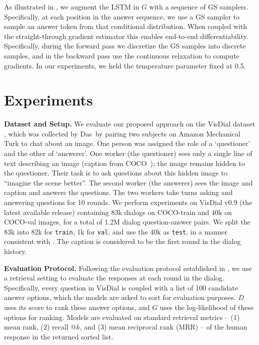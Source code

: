 \documentclass{article}
\newcommand{\vd}{VisDial\xspace}
\newcommand{\train}{\texttt{train}\xspace}
\newcommand{\val}{\texttt{val}\xspace}
\newcommand{\test}{\texttt{test}\xspace}
\begin{document}
As illustrated in , we augment the LSTM in $G$ with a sequence of GS samplers. 
Specifically, at each position in the answer sequence, we use a GS sampler to sample an answer token from that conditional 
distribution. 
When coupled with the straight-through gradient estimator 
\cite{BengioLC13, jang2016categorical} this enables end-to-end differentiability. 
Specifically, 
during the forward pass we discretize the GS samples into discrete samples, 
and in the backward pass use the continuous relaxation to compute gradients.  In our experiments, we held the temperature parameter fixed at 0.5. 
\section{Experiments}
\label{sec:exp}
\vspace{-1mm}


\textbf{Dataset and Setup.}
We evaluate our proposed approach on the \vd dataset \cite{visdial}, 
which was collected by Das~\etal by pairing two subjects on Amazon Mechanical Turk to chat about an image. 
One person was assigned the role of a `questioner' and the other of `answerer'.
One worker (the questioner) sees only a single line of text describing an image (caption from COCO~\cite{lin2014microsoft}); 
the image remains hidden to the questioner. 
Their task is to ask questions about this hidden image to ``imagine the scene better''. 
The second worker (the answerer) sees the image and caption and answers the questions. 
The two workers take turns asking and answering questions for 10 rounds. 
We perform experiments on \vd v0.9 (the latest available release) containing 83k dialogs on COCO-train and 
40k on COCO-val images, for a total of 1.2M dialog question-answer pairs.  
We split the 83k into 82k for \train, 1k for \val, and use the 40k as \test, in a manner consistent with \cite{visdial}. 
The caption is considered to be the first round in the dialog history. 
 
\textbf{Evaluation Protocol.} Following the evaluation protocol established in \cite{visdial}, 
we use a retrieval setting to evaluate the responses at each round in the dialog. 
Specifically, every question in \vd is coupled with a list of 100 candidate answer options, which the models are asked to sort for evaluation purposes. 
$D$ uses its score to rank these answer options, and $G$ uses the log-likelihood of these options for ranking. 
Models are evaluated on standard retrieval metrics -- (1) mean rank, 
(2) recall $@k$, and (3) mean reciprocal rank (MRR) -- of the human response in the returned sorted list.  
\end{document}
